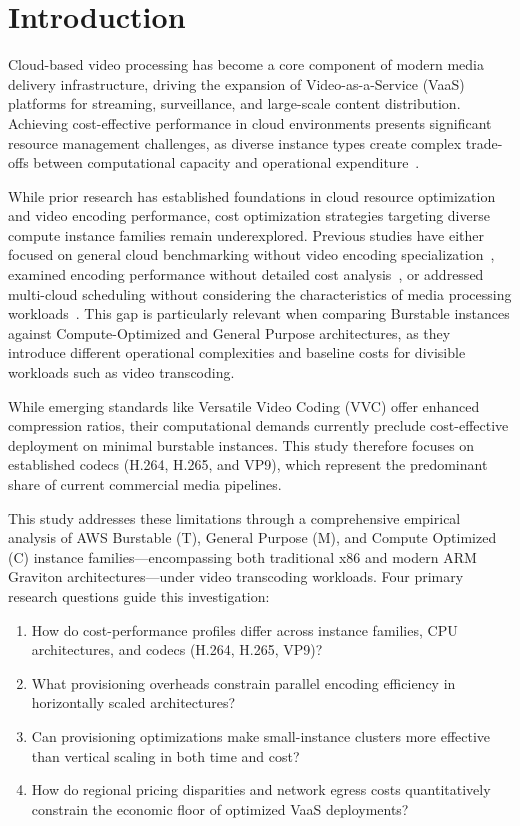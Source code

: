 \documentclass[conference]{IEEEtran}
\begin{document}
\section{Introduction}

Cloud-based video processing has become a core component of modern media
delivery infrastructure, driving the expansion of Video-as-a-Service (VaaS)
platforms for streaming, surveillance, and large-scale content distribution.
Achieving cost-effective performance in cloud environments presents significant
resource management challenges, as diverse instance types create complex
trade-offs between computational capacity and operational
expenditure~\cite{b1,b17}.

While prior research has established foundations in cloud resource optimization
and video encoding performance, cost optimization strategies targeting diverse
compute instance families remain underexplored. Previous studies have either
focused on general cloud benchmarking without video encoding
specialization~\cite{b1}, examined encoding performance without detailed cost
analysis~\cite{b3}, or addressed multi-cloud scheduling without considering the
characteristics of media processing workloads~\cite{b20}. This gap is
particularly relevant when comparing Burstable instances against
Compute-Optimized and General Purpose architectures, as they introduce
different operational complexities and baseline costs for divisible workloads
such as video transcoding.

While emerging standards like Versatile Video Coding (VVC) offer enhanced
compression ratios, their computational demands currently preclude
cost-effective deployment on minimal burstable instances. This study therefore
focuses on established codecs (H.264, H.265, and VP9), which represent the
predominant share of current commercial media pipelines.

This study addresses these limitations through a comprehensive empirical analysis of AWS Burstable (T), General Purpose (M), and Compute Optimized (C) instance families---encompassing both traditional x86 and modern ARM Graviton architectures---under video transcoding workloads. Four primary research questions guide this investigation:
\begin{enumerate}
\item[\textbf{RQ1.}] How do cost-performance profiles differ across instance families, CPU architectures, and codecs (H.264, H.265, VP9)?
\item[\textbf{RQ2.}] What provisioning overheads constrain parallel encoding efficiency in horizontally scaled architectures?
\item[\textbf{RQ3.}] Can provisioning optimizations make small-instance clusters more effective than vertical scaling in both time and cost?
\item[\textbf{RQ4.}] How do regional pricing disparities and network egress costs quantitatively constrain the economic floor of optimized VaaS deployments?
\end{enumerate}
\end{document}
